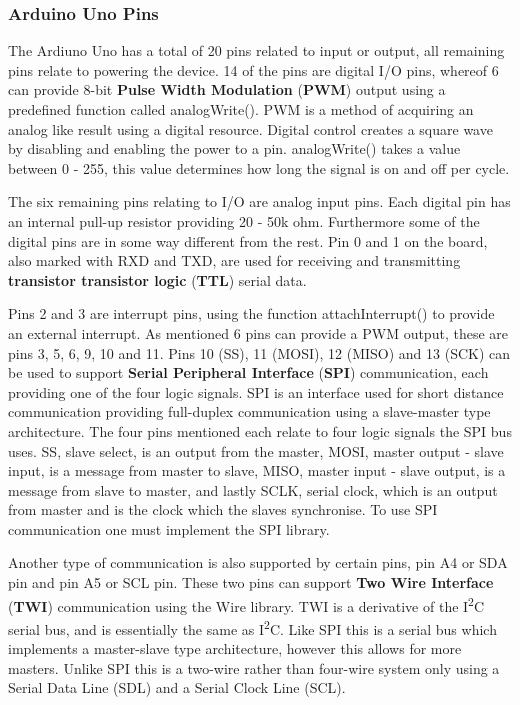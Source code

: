 \subsubsection{Arduino Uno Pins}
The Ardiuno Uno has a total of 20 pins related to input or output, all remaining pins relate to powering the device.
14 of the pins are digital I/O pins, whereof 6 can provide 8-bit \textbf{Pulse Width Modulation} (\textbf{PWM}) output using a predefined function called analogWrite(). %
PWM is a method of acquiring an analog like result using a digital resource.
Digital control creates a square wave by disabling and enabling the power to a pin.
analogWrite() takes a value between 0 - 255, this value determines how long the signal is on and off per cycle.

The six remaining pins relating to I/O are analog input pins.
Each digital pin has an internal pull-up resistor providing 20 - 50k ohm.
Furthermore some of the digital pins are in some way different from the rest.
Pin 0 and 1 on the board, also marked with RXD and TXD, are used for receiving and transmitting \textbf{transistor transistor logic} (\textbf{TTL}) serial data. %


Pins 2 and 3 are interrupt pins, using the function attachInterrupt() to provide an external interrupt. %
As mentioned 6 pins can provide a PWM output, these are pins 3, 5, 6, 9, 10 and 11.
Pins 10 (SS), 11 (MOSI), 12 (MISO) and 13 (SCK) can be used to support \textbf{Serial Peripheral Interface} (\textbf{SPI}) communication, each providing one of the four logic signals. %
SPI is an interface used for short distance communication providing full-duplex communication using a slave-master type architecture.
The four pins mentioned each relate to four logic signals the SPI bus uses.
SS, slave select, is an output from the master, MOSI, master output - slave input, is a message from master to slave, MISO, master input - slave output, is a message from slave to master, and lastly SCLK, serial clock, which is an output from master and is the clock which the slaves synchronise.
To use SPI communication one must implement the SPI library.

Another type of communication is also supported by certain pins, pin A4 or SDA pin and pin A5 or SCL pin.
These two pins can support \textbf{Two Wire Interface} (\textbf{TWI}) communication using the Wire library. %
TWI is a derivative of the I\textsuperscript{2}C serial bus, and is essentially the same as I\textsuperscript{2}C.
Like SPI this is a serial bus which implements a master-slave type architecture, however this allows for more masters.
Unlike SPI this is a two-wire rather than four-wire system only using a Serial Data Line (SDL) and a Serial Clock Line (SCL).
